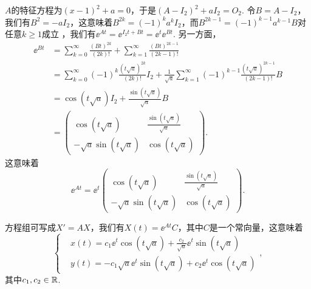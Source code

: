 \begin{solution}
  \begin{inparaenum}[(a)]
    \item $A$的特征方程为$(x-1)^2+a=0$，于是$(A-I_2)^2+aI_2=O_2$. 令$B=A-I_2$，我们有$B^2=-aI_2$，这意味着$B^{2k}=(-1)^ka^kI_2$，而$B^{2k-1}=(-1)^{k-1}a^{k-1}B$对任意$k\ge1$成立 ，我们有$\ee^{At}=\ee^{I_2t+Bt}=\ee^t\ee^{Bt}$. 另一方面，
        \begin{align*}
          \ee^{Bt} & = \sum_{k=0}^\infty \frac{(Bt)^{2k}}{(2k)!} + \sum_{k=1}^\infty \frac{(Bt)^{2k-1}}{(2k-1)!} \\
          & = \sum_{k=0}^\infty(-1)^k\frac{(t\sqrt a)^{2k}}{(2k)!}I_2 + \frac1{\sqrt a}\sum_{k=1}^\infty (-1)^{k-1}\frac{(t\sqrt a)^{2k-1}}{(2k-1)!}B \\
          & = \cos(t\sqrt a)I_2 + \frac{\sin(t\sqrt a)}{\sqrt a}B \\
          & = \begin{pmatrix}
            \cos(t\sqrt a) & \frac{\sin(t\sqrt a)}{\sqrt a} \\
            -\sqrt a\sin(t\sqrt a) & \cos(t\sqrt a)
          \end{pmatrix}.
        \end{align*}
        这意味着
        \[
          \ee^{At} = \ee^t \begin{pmatrix}
            \cos(t\sqrt a) & \frac{\sin(t\sqrt a)}{\sqrt a} \\
            -\sqrt a\sin(t\sqrt a) & \cos(t\sqrt a)
          \end{pmatrix}.
        \]

    \item 方程组可写成$X'=AX$，我们有$X(t)=\ee^{At}C$，其中$C$是一个常向量，这意味着
        \[
          \left\{
            \begin{aligned}
              & x(t) = c_1\ee^t\cos(t\sqrt a) + \frac{c_2}{\sqrt a}\ee^t\sin(t\sqrt a) \\
              & y(t) = -c_1\sqrt a\ee^t\sin(t\sqrt a) + c_2\ee^t \cos(t\sqrt a)
            \end{aligned}
          \right.,
        \]
        其中$c_1,c_2\in\mathbb R$.
  \end{inparaenum}
\end{solution}

